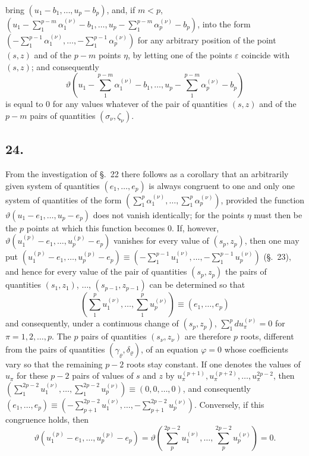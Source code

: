 \documentclass{article}
\begin{document}
bring $(u_{1}-b_{1}, \ldots, u_{p}-b_{p})$, and, if $m < p$, $\left(u_{1} - \displaystyle\sum_{1}^{p-m} \alpha_{1}^{(\nu)} - b_{1}, \ldots, u_{p} - \sum_{1}^{p-m} \alpha_{p}^{(\nu)} - b_{p}\right)$, into the form $\left(-\displaystyle\sum_{1}^{p-1} \alpha_{1}^{(\nu)}, \ldots, -\sum_{1}^{p-1} \alpha_{p}^{(\nu)}\right)$ for any arbitrary position of the point $(s, z)$ and of the $p-m$ points $\eta$, by letting one of the points $\varepsilon$ coincide with $(s, z)$; and consequently
\[ \vartheta\left(u_{1} - \sum_{1}^{p-m} \alpha_{1}^{(\nu)} - b_{1}, \ldots, u_{p} - \sum_{1}^{p-m} \alpha_{p}^{(\nu)} - b_{p}\right) \]
is equal to 0 for any values whatever of the pair of quantities $(s, z)$ and of the $p-m$ pairs of quantities $(\sigma_{\nu}, \zeta_{\nu})$.

\subsection*{24.}

From the investigation of §.~22 there follows as a corollary that an arbitrarily given system of quantities $(e_{1}, \ldots, e_{p})$ is always congruent to one and only one system of quantities of the form $\left(\displaystyle\sum_{1}^{p} \alpha_{1}^{(\nu)}, \ldots, \sum_{1}^{p} \alpha_{p}^{(\nu)}\right)$, provided the function $\vartheta(u_{1}-e_{1}, \ldots, u_{p}-e_{p})$ does not vanish identically; for the points $\eta$ must then be the $p$ points at which this function becomes 0. If, however, $\vartheta(u_{1}^{(p)}-e_{1}, \ldots, u_{p}^{(p)}-e_{p})$ vanishes for every value of $(s_{p}, z_{p})$, then one may put $(u_{1}^{(p)}-e_{1}, \ldots, u_{p}^{(p)}-e_{p}) \equiv \left(-\displaystyle\sum_{1}^{p-1} u_{1}^{(\nu)}, \ldots, -\sum_{1}^{p-1} u_{p}^{(\nu)}\right)$ (§.~23), and hence for every value of the pair of quantities $(s_{p}, z_{p})$ the pairs of quantities $(s_{1}, z_{1})$, $\ldots$, $(s_{p-1}, z_{p-1})$ can be determined so that
\[ \left(\sum_{1}^{p} u_{1}^{(\nu)}, \ldots, \sum_{1}^{p} u_{p}^{(\nu)}\right) \equiv (e_{1}, \ldots, e_{p}) \]
and consequently, under a continuous change of $(s_{p}, z_{p})$, $\displaystyle\sum_{1}^{p} du_{\pi}^{(\nu)} = 0$ for $\pi = 1, 2, \ldots, p$. The $p$ pairs of quantities $(s_{\nu}, z_{\nu})$ are therefore $p$ roots, different from the pairs of quantities $(\gamma_{\varrho}, \delta_{\varrho})$, of an equation $\varphi = 0$ whose coefficients vary so that the remaining $p-2$ roots stay constant. If one denotes the values of $u_{\pi}$ for these $p-2$ pairs of values of $s$ and $z$ by $u_{\pi}^{(p+1)}, u_{\pi}^{(p+2)}, \ldots, u_{\pi}^{2p-2}$, then $\left(\displaystyle\sum_{1}^{2p-2} u_{1}^{(\nu)}, \ldots, \sum_{1}^{2p-2} u_{p}^{(\nu)}\right) \equiv (0, 0, \ldots, 0)$, and consequently $(e_{1}, \ldots, e_{p}) \equiv \left(-\displaystyle\sum_{p+1}^{2p-2} u_{1}^{(\nu)}, \ldots, -\sum_{p+1}^{2p-2} u_{p}^{(\nu)}\right)$. Conversely, if this congruence holds, then
\[ \vartheta(u_{1}^{(p)}-e_{1}, \ldots, u_{p}^{(p)}-e_{p}) = \vartheta\left(\sum_{p}^{2p-2} u_{1}^{(\nu)}, \ldots, \sum_{p}^{2p-2} u_{p}^{(\nu)}\right) = 0. \]
\end{document}
